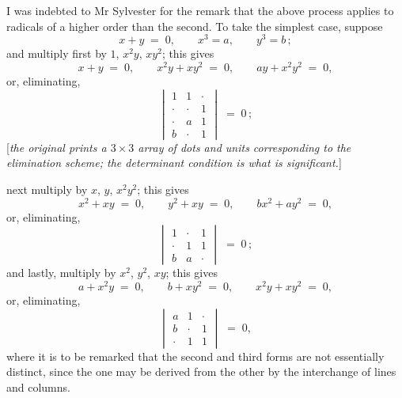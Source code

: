 \documentclass[11pt]{article}
\begin{document}
I was indebted to Mr Sylvester for the remark that the above process applies to radicals of a higher order than the second. To take the simplest case, suppose
\[
x + y \;=\; 0,\qquad x^{3} = a,\qquad y^{3} = b\,;
\]
and multiply first by $1$, $x^{2}y$, $xy^{2}$; this gives
\[
x + y \;=\; 0,\qquad x^{2}y + x y^{2} \;=\; 0,\qquad a y + x^{2} y^{2} \;=\; 0,
\]
or, eliminating,
\[
\begin{vmatrix}
1 & 1 & \cdot \\
\cdot & \cdot & 1 \\
\cdot & a & 1 \\
b & \cdot & 1
\end{vmatrix} \;=\; 0\,;
\]
[\emph{the original prints a $3\times 3$ array of dots and units corresponding to the elimination scheme; the determinant condition is what is significant.}]

\medskip

\noindent next multiply by $x$, $y$, $x^{2}y^{2}$; this gives
\[
x^{2} + xy \;=\; 0,\qquad y^{2} + xy \;=\; 0,\qquad b x^{2} + a y^{2} \;=\; 0,
\]
or, eliminating,
\[
\begin{vmatrix}
1 & \cdot & 1 \\
\cdot & 1 & 1 \\
b & a & \cdot
\end{vmatrix} \;=\; 0\,;
\]
and lastly, multiply by $x^{2}$, $y^{2}$, $xy$; this gives
\[
a + x^{2} y \;=\; 0,\qquad b + x y^{2} \;=\; 0,\qquad x^{2} y + x y^{2} \;=\; 0,
\]
or, eliminating,
\[
\begin{vmatrix}
a & 1 & \cdot \\
b & \cdot & 1 \\
\cdot & 1 & 1
\end{vmatrix} \;=\; 0,
\]
where it is to be remarked that the second and third forms are not essentially distinct, since the one may be derived from the other by the interchange of lines and columns.
\end{document}
